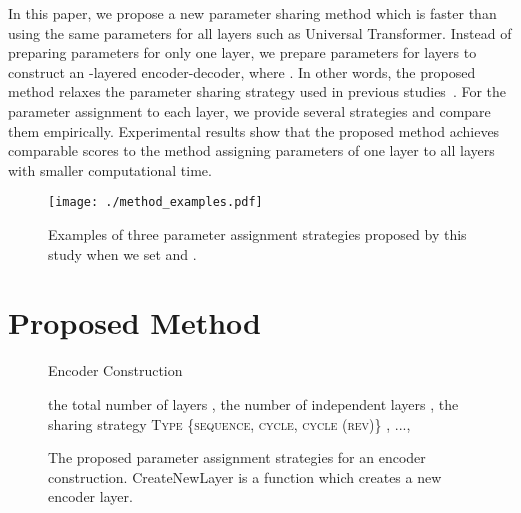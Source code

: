 \documentclass[11pt]{article}
\begin{document}
In this paper, we propose a new parameter sharing method which is faster than using the same parameters for all layers such as Universal Transformer.
Instead of preparing parameters for only one layer, we prepare parameters for  layers to construct an -layered encoder-decoder, where .
In other words, the proposed method relaxes the parameter sharing strategy used in previous studies~\cite{dehghani2019,Dabre_Fujita_2019,lan2020}.
For the parameter assignment to each layer, we provide several strategies and compare them empirically.
Experimental results show that the proposed method achieves comparable scores to the method assigning parameters of one layer to all layers with smaller computational time.

\begin{figure}[!t]
  \centering 
  \texttt{[image: ./method\_examples.pdf]}
   \caption{Examples of three parameter assignment strategies proposed by this study when we set  and .}
   \label{fig:overview}
\end{figure}

\section{Proposed Method}
\begin{figure}[!t]
  \begin{algorithm}[H]
  \caption{Encoder Construction}
  \begin{algorithmic}[1]
   \renewcommand{\algorithmicrequire}{\textbf{Input:}}
   \renewcommand{\algorithmicensure}{\textbf{Output:}}
   \Require the total number of layers , the number of independent layers , the sharing strategy \textsc{Type}  \{\textsc{sequence, cycle, cycle (rev)}\}
   \Ensure , ..., 
     \If{ == }
     \State 
       \If{}
       \State 
       \Else
       \State 
       \EndIf
       \If{}
       \State 
       \Else
       \State 
       \EndIf
       \If{}
       \State 
       \ElsIf{}
       \State 
       \Else
       \State        
       \EndIf
     \EndIf
   \EndFor
  \end{algorithmic}
  \end{algorithm}
  \caption{The proposed parameter assignment strategies for an encoder construction. CreateNewLayer is a function which creates a new encoder layer.}
  \label{fig:enc_construction}
\end{figure}
\end{document}

